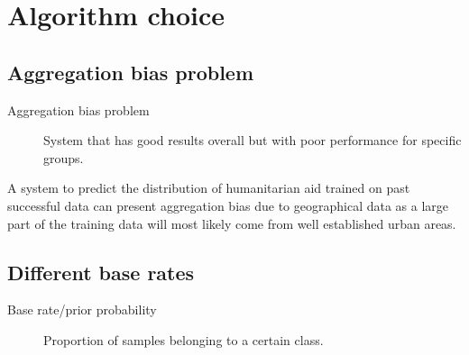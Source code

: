 \section{Algorithm choice}


\subsection{Aggregation bias problem}

\begin{description}
    \item[Aggregation bias problem] 
        System that has good results overall but with poor performance for specific groups.
\end{description}

\begin{example}
    A system to predict the distribution of humanitarian aid trained on past successful data can present aggregation bias due to geographical data as a large part of the training data will most likely come from well established urban areas.
\end{example}


\subsection{Different base rates}

\begin{description}
    \item[Base rate/prior probability] 
        Proportion of samples belonging to a certain class.
\end{description}

